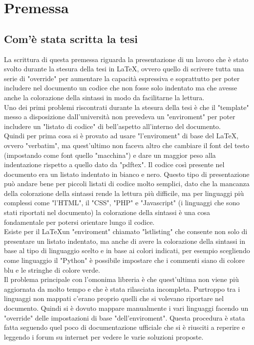 \chapter{Premessa}\label{cap:premessa}

\section{Com'è stata scritta la tesi}\label{sez:Scrittura tesi}

La scrittura di questa premessa riguarda la presentazione di un lavoro che è stato svolto durante la stesura della tesi in \LaTeX, ovvero quello di scrivere tutta una serie di "override" per aumentare la capacità espressiva e soprattutto per poter includere nel documento un codice che non fosse solo indentato ma che avesse anche la colorazione della sintassi in modo da facilitarne la lettura.\\
\bigskip
Uno dei primi problemi riscontrati durante la stesura della tesi è che il "template" messo a disposizione dall'università non prevedeva un "enviroment" per poter includere un "listato di codice" di bell'aspetto all'interno del documento.\\
Quindi per prima cosa si è provato ad usare "l'enviroment" di base del \LaTeX, ovvero "verbatim", ma quest'ultimo non faceva altro  che cambiare il font del testo (impostando come font quello "macchina") e dare un maggior peso alla indentazione rispetto a quello dato da "pdftex". Il codice così presente nel documento era un listato indentato in bianco e nero. Questo tipo di presentazione può andare bene per piccoli listati di codice molto semplici, dato che la mancanza della colorazione della sintassi rende la lettura più difficile, ma per linguaggi più complessi come "l'HTML", il "CSS", "PHP" e "Javascript" (i linguaggi che sono stati riportati nel documento) la colorazione della sintassi è una cosa fondamentale per potersi orientare lungo il codice.\\
Esiste per il \LaTeX un "enviroment" chiamato "lstlisting" che consente non solo di presentare un listato indentato, ma anche di avere la colorazione della sintassi in base al tipo di linguaggio scelto e in base ai colori indicati, per esempio scegliendo come linguaggio il "Python" è possibile impostare che i commenti siano di colore blu e le stringhe di colore verde.\\
Il problema principale con l'omonima libreria è che quest'ultima non viene più aggiornata da molto tempo e che è stata rilasciata incompleta. Purtroppo tra i linguaggi non mappati c'erano proprio quelli che si volevano riportare nel documento. Quindi si è dovuto mappare manualmente i vari linguaggi facendo un "override" delle impostazioni di base "dell'enviroment". Questa procedura è stata fatta seguendo quel poco di documentazione ufficiale che si è riusciti a reperire e leggendo i forum su internet per vedere le varie soluzioni proposte.\\
